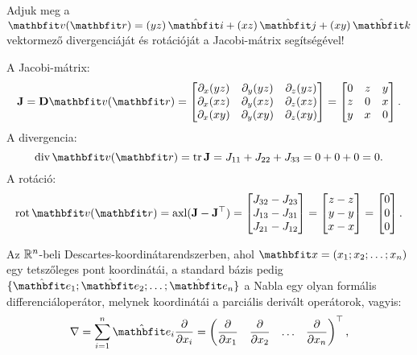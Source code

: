 \documentclass{szb-practice}
\begin{document}
\begin{example}
  Adjuk meg a $\rvec v(\coordvec) = \ijk{yz}{xz}{xy}$ vektormező
  divergenciáját és rotációját a Jacobi-mátrix segítségével!

  A Jacobi-mátrix:
  $$
    \rmat J = \DD \rvec v(\coordvec)
    = \begin{bmatrix}
      \partial_x (yz) & \partial_y (yz) & \partial_z (yz) \\
      \partial_x (xz) & \partial_y (xz) & \partial_z (xz) \\
      \partial_x (xy) & \partial_y (xy) & \partial_z (xy)
    \end{bmatrix}
    = \begin{bmatrix}
      0 & z & y \\
      z & 0 & x \\
      y & x & 0
    \end{bmatrix}
    \text.
  $$
  A divergencia:
  $$
    \Div \rvec v(\coordvec)
    = \trace \rmat J
    = J_{11} + J_{22} + J_{33}
    = 0 + 0 + 0
    = 0
    \text.
  $$
  A rotáció:
  $$
    \rot \rvec v(\coordvec)
    = \operatorname{axl}(\rmat J - \rmat J^\T)
    = \begin{bmatrix}
      J_{32} - J_{23} \\
      J_{13} - J_{31} \\
      J_{21} - J_{12}
    \end{bmatrix}
    = \begin{bmatrix}
      z - z \\
      y - y \\
      x - x
    \end{bmatrix}
    = \begin{bmatrix}
      0 \\ 0 \\ 0
    \end{bmatrix}
    \text.
  $$
\end{example}

\begin{definition}
  Az $\mathbb{R}^n$-beli Descartes-koordinátarendszerben, ahol $\rvec x = (x_1;
    x_2; \dots; x_n)$ egy tetszőleges pont koordinátái, a standard bázis pedig
  $\{ \uvec e_1; \uvec e_2; \dots; \uvec e_n \}$ a Nabla egy olyan formális
  differenciáloperátor, melynek koordinátái a parciális derivált operátorok,
  vagyis:
  $$
    \nabla = \sum_{i = 1}^n \uvec e_i \pdv{}{x_i}
    =
    \begin{pmatrix}
      \displaystyle\pdv{}{x_1} &
      \displaystyle\pdv{}{x_2} &
      \hdots                   &
      \displaystyle\pdv{}{x_n}
    \end{pmatrix}^\T
    \text,
  $$
\end{definition}
\end{document}
